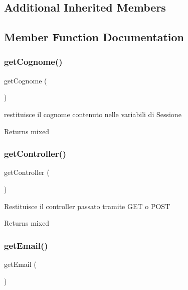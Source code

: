 \subsection*{Additional Inherited Members}


\subsection{Member Function Documentation}
\mbox{\label{class_v_utente_aa114419de31d6dd2151842ea68f84283}} 
\subsubsection{\texorpdfstring{get\+Cognome()}{getCognome()}}
{\footnotesize\ttfamily get\+Cognome (\begin{DoxyParamCaption}{ }\end{DoxyParamCaption})}

restituisce il cognome contenuto nelle variabili di Sessione

\begin{DoxyReturn}{Returns}
mixed 
\end{DoxyReturn}
\mbox{\label{class_v_utente_aa8b89e0bad51878addc1300cd3e95b5c}} 
\subsubsection{\texorpdfstring{get\+Controller()}{getController()}}
{\footnotesize\ttfamily get\+Controller (\begin{DoxyParamCaption}{ }\end{DoxyParamCaption})}

Restituisce il controller passato tramite G\+ET o P\+O\+ST

\begin{DoxyReturn}{Returns}
mixed 
\end{DoxyReturn}
\mbox{\label{class_v_utente_a02a01849f28e2535e888ae4ec87b20f2}} 
\subsubsection{\texorpdfstring{get\+Email()}{getEmail()}}
{\footnotesize\ttfamily get\+Email (\begin{DoxyParamCaption}{ }\end{DoxyParamCaption})}

